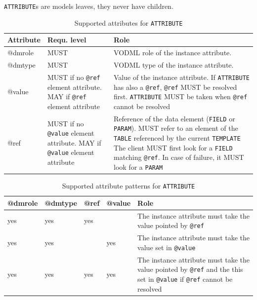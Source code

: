 \documentclass[11pt,a4paper]{ivoa}
\begin{document}
 \texttt{ATTRIBUTE}s are models leaves, they never have children.


\begin{table}[ht!]
     \begin{tabular}{|p{1.5cm}|p{4cm}|p{7cm}|}
       \hline Attribute & Requ. level & Role\\
       \hline  
      @dmrole   & MUST & VODML role of the instance attribute.\\       
       \hline 
      @dmtype   & MUST & VODML type of the instance attribute.\\
       \hline  
      @value  & MUST if no \texttt{@ref } element attribute. \newline MAY if \texttt{@ref} element attribute 
                    & Value of the instance attribute. 
                     \newline If  \texttt{ATTRIBUTE} has also a \texttt{@ref}, \texttt{@ref} MUST be resolved first.
                     \texttt{ATTRIBUTE}  MUST be taken when \texttt{@ref} cannot be resolved \\
        \hline
       @ref  & MUST if no \texttt{@value} element attribute. 
                     \newline MAY if \texttt{@value} element attribute 
                & Reference of the data element (\texttt{FIELD} or \texttt{PARAM}).  
                    \newline MUST refer to an element of the \texttt{TABLE}  referenced by the current     
                    \texttt{TEMPLATE}                    
                    \newline The client MUST first look for a \texttt{FIELD} matching \texttt{@ref}. 
                    \newline In case of failure, it MUST look for a \texttt{PARAM}
                    \\
       \hline 
     \end{tabular}
     \caption{Supported attributes for  \texttt{ATTRIBUTE}} 
 \end{table}

\begin{table}[ht!]
  \begin{tabular}{|p{1.5cm}|p{1.5cm}|p{1.5cm}|p{1.5cm}|p{5cm}|}
    \hline @dmrole  &  @dmtype &  @ref &  @value &  Role\\
    \hline  yes & yes &  yes & & The instance attribute must take the value pointed by \texttt{@ref} \\
    \hline  yes & yes &  & yes & The instance attribute must take the value set in  \texttt{@value} \\
    \hline  yes & yes &  yes & yes 
              & The instance attribute must take the value pointed by \texttt{@ref} 
                  \newline and the this set in  \texttt{@value} if \texttt{@ref} cannot be resolved\\
    \hline 
  \end{tabular}
  \caption{Supported attribute patterns for  \texttt{ATTRIBUTE}} 
 \end{table}
\end{document}

